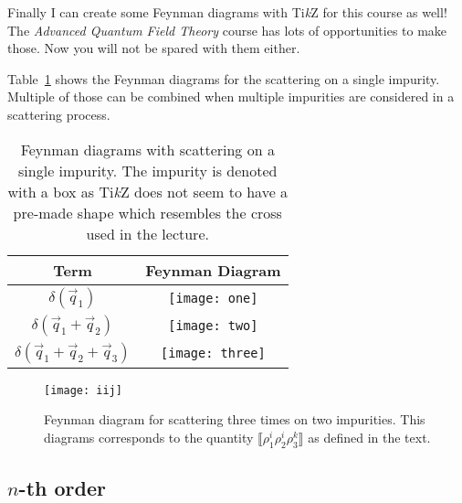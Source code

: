 \documentclass[11pt, english, fleqn, DIV=15, headinclude, BCOR=1cm]{scrartcl}
\newcommand\ensemble[1]{\llbracket #1 \rrbracket}
\begin{document}
Finally I can create some Feynman diagrams with Ti\emph{k}Z for this course as
well! \Laughey The \emph{Advanced Quantum Field Theory} course has lots of
opportunities to make those. Now you will not be spared with them either.
\Winkey

Table~\ref{tab:single} shows the Feynman diagrams for the scattering on a
single impurity. Multiple of those can be combined when multiple impurities are
considered in a scattering process.

\begin{table}
    \centering
    \begin{tabular}{cc}
        \toprule
        Term & Feynman Diagram \\
        \midrule
        $\delta(\vec q_1)$ & \texttt{[image: one]} \\
        \midrule
        $\delta(\vec q_1 + \vec q_2)$ & \texttt{[image: two]} \\
        \midrule
        $\delta(\vec q_1 + \vec q_2 + \vec q_3)$ & \texttt{[image: three]} \\
        \bottomrule
    \end{tabular}
    \caption{%
        Feynman diagrams with scattering on a single impurity. The impurity is
        denoted with a box as Ti\emph{k}Z does not seem to have a pre-made
        shape which resembles the cross used in the lecture.
    }
    \label{tab:single}
\end{table}

\begin{figure}
    \centering
    \texttt{[image: iij]}
    \caption{%
        Feynman diagram for scattering three times on two impurities. This
        diagrams corresponds to the quantity $\ensemble{\rho_1^i \rho_2^i
        \rho_3^k}$ as defined in the text.
    }
    \label{fig:iij}
\end{figure}

\subsection{$n$-th order}
\end{document}
